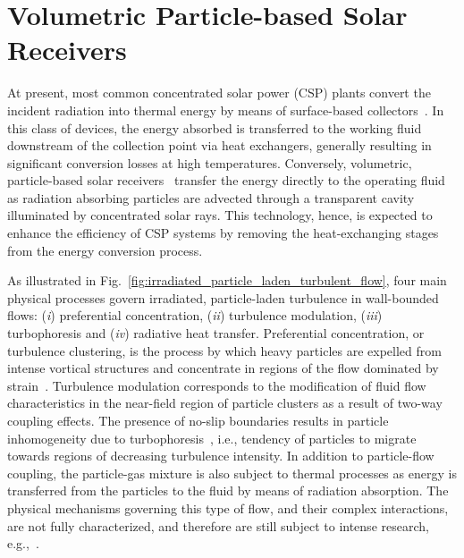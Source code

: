 \chapter{Volumetric Particle-based Solar Receivers}

At present, most common concentrated solar power (CSP) plants convert the incident radiation into thermal energy by means of surface-based collectors~\citep{Ho2014-A}.
In this class of devices, the energy absorbed is transferred to the working fluid downstream of the collection point via heat exchangers, generally resulting in significant conversion losses at high temperatures.
Conversely, volumetric, particle-based solar receivers~\citep{Ho2017-A} transfer the energy directly to the operating fluid as radiation absorbing particles are advected through a transparent cavity illuminated by concentrated solar rays.
This technology, hence, is expected to enhance the efficiency of CSP systems by removing the heat-exchanging stages from the energy conversion process.

As illustrated in Fig.~\ref{fig:irradiated_particle_laden_turbulent_flow}, four main physical processes govern irradiated, particle-laden turbulence in wall-bounded flows: (\emph{i}) preferential concentration, (\emph{ii}) turbulence modulation, (\emph{iii}) turbophoresis and (\emph{iv}) radiative heat transfer.
Preferential concentration, or turbulence clustering, is the process by which heavy particles are expelled from intense vortical structures and concentrate in regions of the flow dominated by strain~\citep{Balachandar2010-A}.
Turbulence modulation corresponds to the modification of fluid flow characteristics in the near-field region of particle clusters as a result of two-way coupling effects.
The presence of no-slip boundaries results in particle inhomogeneity due to turbophoresis~\citep{Caporaloni1975-A}, i.e., tendency of particles to migrate towards regions of decreasing turbulence intensity.
In addition to particle-flow coupling, the particle-gas mixture is also subject to thermal processes as energy is transferred from the particles to the fluid by means of radiation absorption.
The physical mechanisms governing this type of flow, and their complex interactions, are not fully characterized, and therefore are still subject to intense research, e.g.,~\citep{Zamansky2014-A,Frankel2016-A,Pouransari2017-A}.

